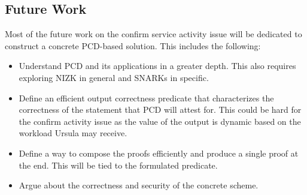 \subsection{Future Work}
\label{future-work}
Most of the future work on the confirm service activity issue 
will be dedicated to construct a concrete PCD-based solution. This 
includes the following:
\begin{itemize}
\item Understand PCD and its applications in a greater depth. This 
also requires exploring NIZK in general and SNARKs in specific. 

\item Define an efficient output correctness predicate that characterizes 
the correctness of the statement that PCD will attest for. This could be 
hard for the confirm activity issue as the value of the output is dynamic 
based on the workload Ursula may receive.

\item Define a way to compose the proofs efficiently and produce 
a single proof at the end. This will be tied to the formulated predicate.

\item Argue about the correctness and security of the concrete scheme.
\end{itemize} 

